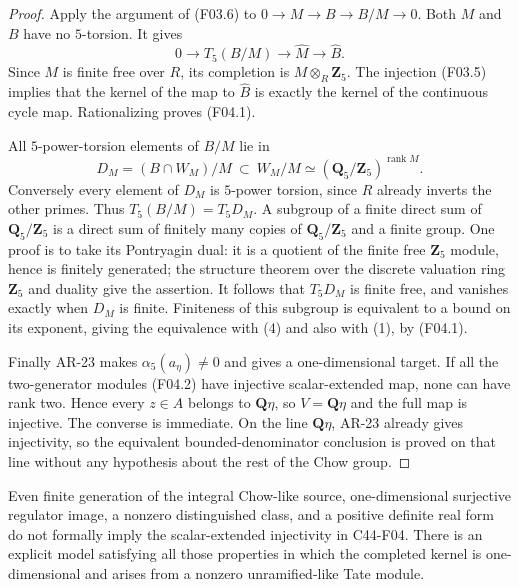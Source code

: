 \begin{proof}
Apply the argument of (F03.6) to
$0\to M\to B\to B/M\to0$.  Both $M$ and $B$ have no
$5$-torsion.  It gives
\[
 0\longrightarrow T_5(B/M)\longrightarrow\widehat M
                         \longrightarrow\widehat B.
\]
Since $M$ is finite free over $R$, its completion is
$M\otimes_R\mathbf Z_5$.  The injection (F03.5) implies
that the kernel of the map to $\widehat B$ is exactly the
kernel of the continuous cycle map.  Rationalizing proves
(F04.1).

All $5$-power-torsion elements of $B/M$ lie in
\[
 D_M=(B\cap W_M)/M\ \subset\ W_M/M
          \simeq(\mathbf Q_5/\mathbf Z_5)^{\operatorname{rank}M}.
\]
Conversely every element of $D_M$ is $5$-power torsion, since
$R$ already inverts the other primes.  Thus $T_5(B/M)=T_5D_M$.
A subgroup of a finite direct sum of $\mathbf Q_5/\mathbf Z_5$
is a direct sum of finitely many copies of
$\mathbf Q_5/\mathbf Z_5$ and a finite group.  One proof is to
take its Pontryagin dual: it is a quotient of the finite free
$\mathbf Z_5$ module, hence is finitely generated; the structure
theorem over the discrete valuation ring $\mathbf Z_5$ and
duality give the assertion.  It follows that $T_5D_M$ is finite
free, and vanishes exactly when $D_M$ is finite.  Finiteness of
this subgroup is equivalent to a bound on its exponent, giving
the equivalence with (4) and also with (1), by (F04.1).

Finally AR-23 makes $\alpha_5(a_\eta)\ne0$ and gives a
one-dimensional target.  If all the two-generator modules
(F04.2) have injective scalar-extended map, none can have rank
two.  Hence every $z\in A$ belongs to $\mathbf Q\eta$, so
$V=\mathbf Q\eta$ and the full map is injective.  The converse
is immediate.  On the line $\mathbf Q\eta$, AR-23 already gives
injectivity, so the equivalent bounded-denominator conclusion
is proved on that line without any hypothesis about the rest
of the Chow group.
\end{proof}

\begin{proposition}
\label{C44-F05}
Even finite generation of the integral Chow-like source,
one-dimensional surjective regulator image, a nonzero distinguished
class, and a positive definite real form do not formally imply
the scalar-extended injectivity in C44-F04.  There is an explicit
model satisfying all those properties in which the completed
kernel is one-dimensional and arises from a nonzero unramified-like
Tate module.
\end{proposition}

